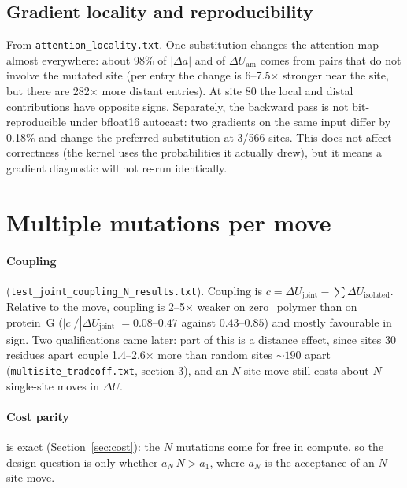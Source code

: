 \documentclass[11pt,a4paper]{article}
\newcommand{\Uam}{U_{\mathrm{am}}}
\newcommand{\file}[1]{\texttt{#1}}
\begin{document}
\subsection{Gradient locality and reproducibility}
From \file{attention\_locality.txt}. One substitution changes the attention map
almost everywhere: about 98\% of $|\Delta a|$ and of $\Delta\Uam$ comes from
pairs that do not involve the mutated site (per entry the change is 6--7.5$\times$
stronger near the site, but there are 282$\times$ more distant entries). At site
80 the local and distal contributions have opposite signs. Separately, the
backward pass is not bit-reproducible under bfloat16 autocast: two gradients on
the same input differ by 0.18\% and change the preferred substitution at 3/566
sites. This does not affect correctness (the kernel uses the probabilities it
actually drew), but it means a gradient diagnostic will not re-run identically.

\section{Multiple mutations per move}
\paragraph{Coupling} (\file{test\_joint\_coupling\_N\_results.txt}). Coupling is
$c = \Delta U_{\mathrm{joint}} - \sum\Delta U_{\mathrm{isolated}}$. Relative to the
move, coupling is 2--5$\times$ weaker on zero\_polymer than on protein~G
($|c|/|\Delta U_{\mathrm{joint}}| = 0.08$--$0.47$ against $0.43$--$0.85$) and mostly
favourable in sign. Two qualifications came later: part of this is a distance
effect, since sites 30 residues apart couple 1.4--2.6$\times$ more than random
sites $\sim190$ apart (\file{multisite\_tradeoff.txt}, section 3), and an $N$-site
move still costs about $N$ single-site moves in $\Delta U$.

\paragraph{Cost parity} is exact (Section~\ref{sec:cost}): the $N$ mutations come
for free in compute, so the design question is only whether
$a_N\,N > a_1$, where $a_N$ is the acceptance of an $N$-site move.
\end{document}
